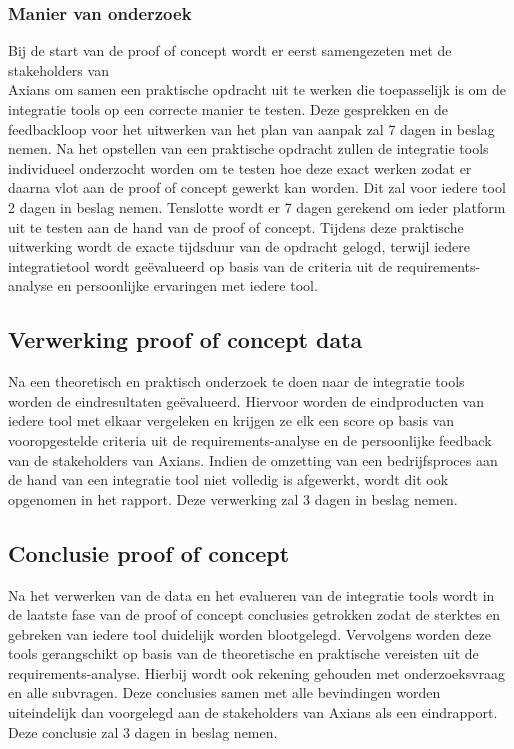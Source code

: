 \subsubsection{Manier van onderzoek}
\label{sec:Manier van onderzoek}

Bij de start van de proof of concept wordt er eerst samengezeten met de stakeholders van \\Axians om samen een praktische opdracht uit te werken die toepasselijk is om de integratie tools op een correcte manier te testen. Deze gesprekken en de feedbackloop voor het uitwerken van het plan van aanpak zal 7 dagen in beslag nemen. Na het opstellen van een praktische opdracht zullen de integratie tools individueel onderzocht worden om te testen hoe deze exact werken zodat er daarna vlot aan de proof of concept gewerkt kan worden. Dit zal voor iedere tool 2 dagen in beslag nemen. Tenslotte wordt er 7 dagen gerekend om ieder platform uit te testen aan de hand van de proof of concept. Tijdens deze praktische uitwerking wordt de exacte tijdsduur van de opdracht gelogd, terwijl iedere integratietool wordt geëvalueerd op basis van de criteria uit de requirements-analyse en persoonlijke ervaringen met iedere tool.

\subsection{Verwerking proof of concept data}
\label{sec:Verwerking proof of concept data}

Na een theoretisch en praktisch onderzoek te doen naar de integratie tools worden de eindresultaten geëvalueerd. Hiervoor worden de eindproducten van iedere tool met elkaar vergeleken en krijgen ze elk een score op basis van vooropgestelde criteria uit de requirements-analyse en de persoonlijke feedback van de stakeholders van Axians. Indien de omzetting van een bedrijfsproces aan de hand van een integratie tool niet volledig is afgewerkt, wordt dit ook opgenomen in het rapport. Deze verwerking zal 3 dagen in beslag nemen.

\subsection{Conclusie proof of concept}
\label{sec:Conclusie proof of concept}

Na het verwerken van de data en het evalueren van de integratie tools wordt in de laatste fase van de proof of concept conclusies getrokken zodat de sterktes en gebreken van iedere tool duidelijk worden blootgelegd. Vervolgens worden deze tools gerangschikt op basis van de theoretische en praktische vereisten uit de requirements-analyse. Hierbij wordt ook rekening gehouden met onderzoeksvraag en alle subvragen. Deze conclusies samen met alle bevindingen worden uiteindelijk dan voorgelegd aan de stakeholders van Axians als een eindrapport. Deze conclusie zal 3 dagen in beslag nemen.

